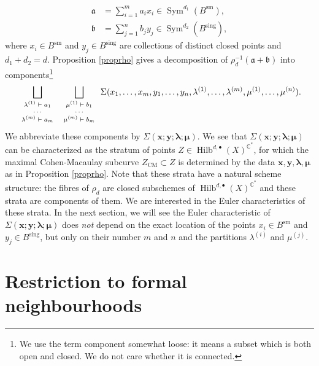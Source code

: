 \documentclass{amsart}
\theoremstyle{definition}
\newcommand{\CC} {\mathbb{C}}          %
\newcommand{\Sym}{\operatorname{Sym}}
\newcommand{\Hilb}{\operatorname{Hilb}}
\newcommand{\CM}{\operatorname{CM}}
\newcommand{\sm}{\operatorname{sm}}
\newcommand{\sing}{\operatorname{sing}}
\begin{document}
\begin{align*}
\mathfrak{a} &= \sum_{i=1}^{m} a_i x_i \in \Sym^{d_1}(B^{\sm}), \\
\mathfrak{b} &= \sum_{j=1}^{n} b_j y_j \in \Sym^{d_2}(B^{\sing}),
\end{align*}
where  $x_i \in B^{\sm}$ and $y_j \in B^{\sing}$ are collections of distinct closed points and $d_1+d_2=d$. Proposition \ref{proprho} gives a decomposition of $\rho_{d}^{-1} ( \mathfrak{a} + \mathfrak{b} )$ into components\footnote{We use the term component somewhat loose: it means a subset which is both open and closed. We do not care whether it is connected.}
\begin{equation} \label{comps}
\bigsqcup_{{\scriptsize{\begin{array}{c} \lambda^{(1)} \vdash a_1 \\ \cdots \\ \lambda^{(m)} \vdash a_m \end{array}}}} \bigsqcup_{\scriptsize{\begin{array}{c} \mu^{(1)} \vdash b_1 \\ \cdots \\ \mu^{(m)} \vdash b_m \end{array}}} \Sigma(x_1, \ldots, x_m, y_1, \ldots, y_n, \lambda^{(1)}, \ldots, \lambda^{(m)}, \mu^{(1)}, \ldots, \mu^{(n)}).
\end{equation}
We abbreviate these components by $\Sigma(\boldsymbol{x};\boldsymbol{y};\boldsymbol{\lambda};\boldsymbol{\mu})$. We see that $\Sigma(\boldsymbol{x};\boldsymbol{y};\boldsymbol{\lambda};\boldsymbol{\mu})$ can be characterized as the stratum of points $Z \in \Hilb^{d,\bullet}(X)^{\CC^*}$, for which the maximal Cohen-Macaulay subcurve $Z_{\CM} \subset Z$ is determined by the data $\boldsymbol{x}, \boldsymbol{y}, \boldsymbol{\lambda}, \boldsymbol{\mu}$ as in Proposition \ref{proprho}. Note that these strata have a natural scheme structure: the fibres of $\rho_d$ are closed subschemes of $\Hilb^{d,\bullet}(X)^{\CC^*}$ and these strata are components of them. We are interested in the Euler characteristics of these strata. In the next section, we will see the Euler characteristic of $\Sigma(\boldsymbol{x};\boldsymbol{y};\boldsymbol{\lambda};\boldsymbol{\mu})$ does \emph{not} depend on the exact location of the points $x_i \in B^{\sm}$ and $y_j \in B^{\sing}$, but only on their number $m$ and $n$ and the partitions $\lambda^{(i)}$ and $\mu^{(j)}$.


\section{Restriction to formal neighbourhoods} \label{formal}
\end{document}
